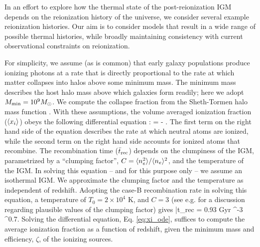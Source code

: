 In an effort to explore how the thermal state of the post-reionization 
IGM depends on the reionization history of the universe, we consider several example reionization histories. 
Our aim is to consider models that result in a wide range of possible thermal histories, while broadly maintaining 
consistency with current observational constraints on reionization. 

For simplicity, we assume (as is common) that early galaxy populations produce ionizing photons at a rate
that is directly proportional
to the rate at which matter collapses into halos above some minimum mass. The minimum mass describes the 
host halo mass above which galaxies form readily; here we adopt $M_{\rm min} = 10^9 M_\odot$. We compute the collapse fraction
from the Sheth-Tormen halo mass function \citep{Sheth:1999su}.
With these assumptions, the volume averaged ionization fraction ($\langle x_i \rangle$) obeys the following differential equation \citep{1987ApJ...321L.107S,1999ApJ...514..648M}:
\beqa
{} = \zeta {} - .
\label{eq:xi_ode}
\eeqa
The first term on the right hand side of the equation describes the rate at which neutral atoms are ionized, while the second
term on the right hand side accounts for ionized atoms that recombine. The recombination time ($\bar{t}_{\rm rec}$) depends on the clumpiness of the IGM,
parametrized by a ``clumping factor'', $C=\langle n_e^2 \rangle/\langle n_e \rangle^2$, and the temperature of the IGM. In solving this equation -- and for this purpose only -- we assume an isothermal
IGM. We approximate the clumping factor and the temperature as independent of redshift.
Adopting the case-B recombination rate in solving this equation, a temperature of $T_0 = 2 \times 10^4$ K, and $C=3$ (see e.g. \citealt{Pawlik:2008mr,McQuinn:2011aa} for a discussion regarding plausible values of the clumping factor) gives
\beqa
\bar{t}_{\rm rec} = 0.93 {\rm Gyr}  ^{-3} ^{0.7}.
\label{eq:trec}
\eeqa
Solving the differential equation, Eq. \ref{eq:xi_ode}, suffices to compute the average ionization fraction as a function of redshift, given
the minimum mass and efficiency, $\zeta$, of the ionizing sources.

